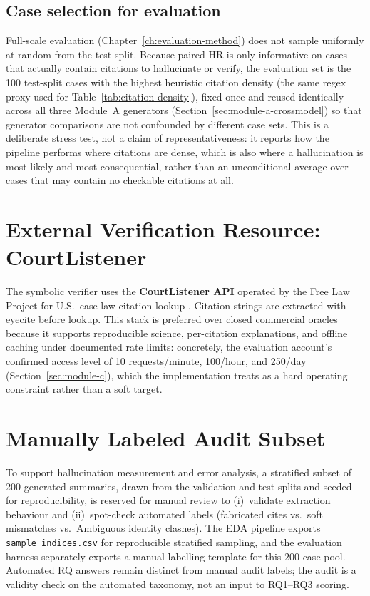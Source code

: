 \subsection{Case selection for evaluation}
\label{sec:eval-case-selection}
Full-scale evaluation (Chapter~\ref{ch:evaluation-method}) does not sample uniformly at random from the test split. Because paired HR is only informative on cases that actually contain citations to hallucinate or verify, the evaluation set is the 100 test-split cases with the highest heuristic citation density (the same regex proxy used for Table~\ref{tab:citation-density}), fixed once and reused identically across all three Module~A generators (Section~\ref{sec:module-a-crossmodel}) so that generator comparisons are not confounded by different case sets. This is a deliberate stress test, not a claim of representativeness: it reports how the pipeline performs where citations are dense, which is also where a hallucination is most likely and most consequential, rather than an unconditional average over cases that may contain no checkable citations at all.

\section{External Verification Resource: CourtListener}
\label{sec:data-courtlistener}

The symbolic verifier uses the \textbf{CourtListener API} operated by the Free Law Project for U.S.\ case-law citation lookup \cite{courtlistener_api,freelawproject}. Citation strings are extracted with eyecite \cite{eyecite2021} before lookup. This stack is preferred over closed commercial oracles because it supports reproducible science, per-citation explanations, and offline caching under documented rate limits: concretely, the evaluation account's confirmed access level of 10 requests/minute, 100/hour, and 250/day (Section~\ref{sec:module-c}), which the implementation treats as a hard operating constraint rather than a soft target.

\section{Manually Labeled Audit Subset}
\label{sec:audit-subset}

To support hallucination measurement and error analysis, a stratified subset of 200 generated summaries, drawn from the validation and test splits and seeded for reproducibility, is reserved for manual review to (i)~validate extraction behaviour and (ii)~spot-check automated labels (fabricated cites vs.\ soft mismatches vs.\ Ambiguous identity clashes). The EDA pipeline exports \texttt{sample\_indices.csv} for reproducible stratified sampling, and the evaluation harness separately exports a manual-labelling template for this 200-case pool. Automated RQ answers remain distinct from manual audit labels; the audit is a validity check on the automated taxonomy, not an input to RQ1--RQ3 scoring.

